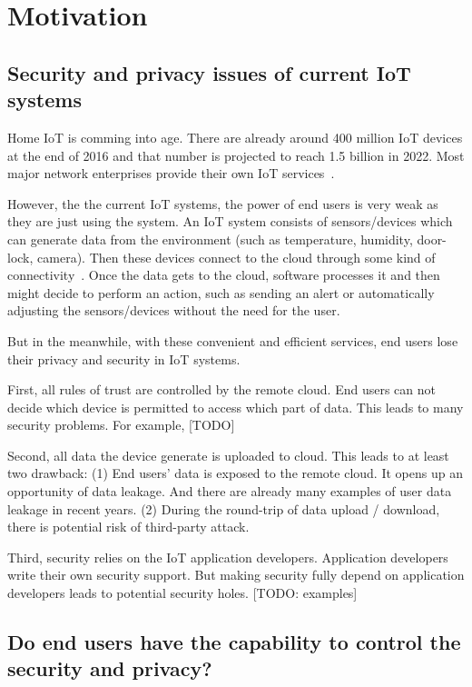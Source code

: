 \section{Motivation}
\subsection{Security and privacy issues of current IoT systems}

Home IoT is comming into age. There are already around 400 million IoT devices at the end of 2016 and that number is projected to reach 1.5 billion in 2022. Most major network enterprises provide their own IoT services~\cite{?}.

However, the the current IoT systems, the power of end users is very weak as they are just using the system. An IoT system consists of sensors/devices which can generate data from the environment (such as temperature, humidity, door-lock, camera). Then these devices connect to the cloud through some kind of connectivity~\cite{?}. Once the data gets to the cloud, software processes it and then might decide to perform an action, such as sending an alert or automatically adjusting the sensors/devices without the need for the user.

But in the meanwhile, with these convenient and efficient services, end users lose their privacy and security in IoT systems. 

First,  all rules of trust are controlled by the remote cloud. End users can not decide which device is permitted to access which part of data. This leads to many security problems. For example, [TODO]

Second, all data the device generate is uploaded to cloud. This leads to at least two drawback: (1) End users' data is exposed to the remote cloud. It opens up an opportunity of data leakage. And there are already many examples of user data leakage in recent years. (2) During the round-trip of data upload / download, there is potential risk of third-party attack.

Third, security relies on the IoT application developers. Application developers write their own security support. But making security fully depend on application developers leads to potential security holes. [TODO: examples]

\subsection{Do end users have the capability to control the security and privacy?}

